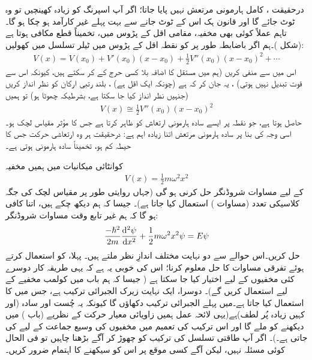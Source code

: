 درحقیقت ، کامل ہارمونی مرتعش نہیں پایا جاتا؛ اگر آپ اسپرنگ کو زیادہ کھینچیں تو وہ ٹوٹ جائے گا اور قانون ہک اس کے ٹوٹ جانے سے بہت پہلے غیر کارآمد ہو چکا ہو گا۔ تاہم عملاً کوئی بھی مخفیہ، مقامی  اقل  کے پڑوس میں، تخمیناً قطع مکافی ہوتا ہے (شکل )۔ہم اگر  باضابطہ طور پر   کو نقطہ اقل کے پڑوس میں ٹیلر تسلسل میں کھولیں:
\begin{align*}
V(x)=V( x_{0})+V'(x_{0})(x-x_{0})+\frac{1}{2}V''(x_{0})(x-x_{0})^{2}+\cdots
\end{align*}
اس میں  سے  منفی کریں  (ہم  میں  مستقل کا اضافہ بلا کسی حرج کے   کر سکتے ہیں، کیونکہ اس سے قوت تبدیل نہیں ہوتی) ، یہ جان کر کہ   ہے  (چونکہ    ایک  اقل ہے) ،   بلند رتبی ارکان کو نظر انداز کریں (جنہیں نظر انداز کیا جا سکتا ہے، بشرطیکہ     چھوٹا ہو)  تو ہمیں
\begin{align*}
V(x)\cong\frac{1}{2}V''(x_{0})(x-x_{0})^{2}
\end{align*} 
حاصل ہوتا ہے، جو نقطہ  پر   ایسے سادہ ہارمونی ارتعاش کو ظاہر کرتا ہے جس کا مؤثر مقیاس لچک  ہو۔  اسی وجہ کی بنا پر  سادہ ہارمونی مرتعش اتنا زیادہ  اہم ہے:  درحقیقت ہر وہ ارتعاشی حرکت جس کا حیطہ کم ہو،  تخمیناً سادہ ہارمونی ہوتی ہے۔

کوانٹائی میکانیات میں ہمیں مخفیہ
\begin{align}\label{مساوات_شروڈنگر_مخفیہ_ہارمونی}
V(x)=\frac{1}{2}m\omega ^{2}x^{2}
\end{align}
کے لیے مساوات شروڈنگر حل کرنی ہو گی (جہاں روایتی طور پر مقیاس لچک کی جگہ کلاسیکی تعدد (مساوات ) استعمال کیا جاتا ہے)۔ جیسا کہ ہم دیکھ چکے ہیں، اتنا کافی ہو گا کہ ہم غیر تابع وقت مساوات شروڈنگر:
\begin{align}\label{مساوات_شروڈنگر_مخفی_قوہ_الف}
\frac{-\hslash ^{2}}{2m}\frac{\dif{^{2}\psi}}{\dif{x^{2}}}+\frac{1}{2}m\omega ^{2}x^{2}\psi=E\psi
\end{align}
حل کریں۔اس حوالے سے دو نہایت  مختلف  اندازِ نظر ملتے ہیں۔ پہلا،  کو استعمال کرتے ہوئے   تفرقی مساوات کا حل معلوم کرنا؛ اس کی خوبی یہ ہے کہ یہی طریقہ کار دوسرے کئی مخفیوں کے لیے اختیار کیا جا سکتا ہے (  جیسا  کہ ہم باب  میں کولمب مخفیے کے لیے استعمال کریں گے)۔ دوسرا، ایک نہایت زیرک الجبرائی ترکیب ہے، جس میں   کا استعمال کیا جاتا ہے۔میں پہلے الجبرائی ترکیب دکھاؤں گا کیونکہ یہ چُست اور سادہ  (اور کہیں زیادہ پُر لطف)ہے(یہی لائحہ عمل ہمیں زاویائی معیار حرکت کے نظریے (باب ) میں دیکھنے کو ملے گا اور اس  ترکیب کی تعمیم     میں مخفیوں کی وسیع جماعت کے لیے کی جاتی ہے۔)۔ اگر آپ طاقتی تسلسل کی ترکیب کو چھوڑ کر آگے بڑھنا چاہیں تو  فی الحال کوئی مسئلہ نہیں، لیکن آگے کسی موقع پر اس کو سیکھنے کا اہتمام ضرور کریں۔ 

